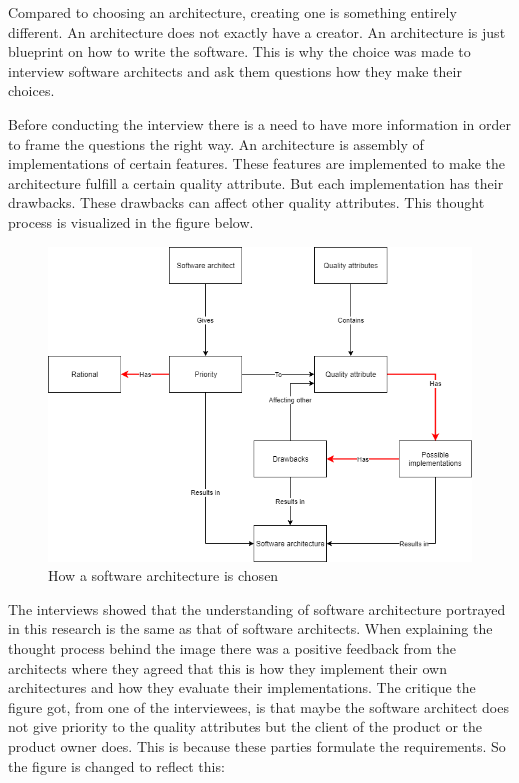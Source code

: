 Compared to choosing an architecture, creating one is something entirely different. An architecture does not exactly have a creator. An architecture is just blueprint on how to write the software. This is why the choice was made to interview software architects and ask them questions how they make their choices.

Before conducting the interview there is a need to have more information in order to frame the questions the right way. An architecture is assembly of implementations of certain features. These features are implemented to make the architecture fulfill a certain quality attribute. But each implementation has their drawbacks. These drawbacks can affect other quality attributes. This thought process is visualized in the figure below.

\begin{figure}[H]
	\includegraphics[width=\linewidth]{creating_architecture.png}
	\caption{How a software architecture is chosen}
\end{figure}

The interviews showed that the understanding of software architecture portrayed in this research is the same as that of software architects. When explaining the thought process behind the image there was a positive feedback from the architects where they agreed that this is how they implement their own architectures and how they evaluate their implementations. The critique the figure got, from one of the interviewees, is that maybe the software architect does not give priority to the quality attributes but the client of the product or the product owner does. This is because these parties formulate the requirements. So the figure is changed to reflect this:

